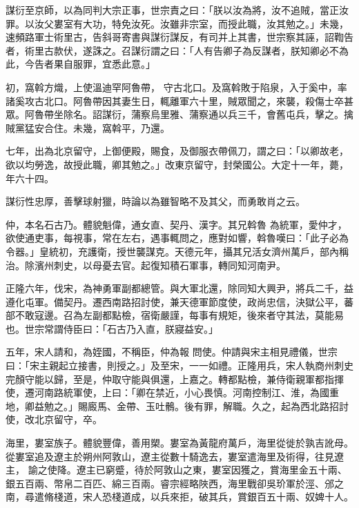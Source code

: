 \begin{pinyinscope}
 謀衍至京師，以為同判大宗正事，世宗責之曰：「朕以汝為將，汝不追賊，當正汝罪。以汝父婁室有大功，特免汝死。汝雖非宗室，而授此職，汝其勉之。」未幾，速頻路軍士術里古，告斜哥寄書與謀衍謀反，有司并上其書，世宗察其誣，詔鞫告者，術里古款伏，遂誅之。召謀衍謂之曰：「人有告卿子為反謀者，朕知卿必不為此，今告者果自服罪，宜悉此意。」



 初，窩斡方熾，上使溫迪罕阿魯帶，
 守古北口。及窩斡敗于陷泉，入于奚中，率諸奚攻古北口。阿魯帶因其妻生日，輒離軍六十里，賊眾聞之，來襲，殺傷士卒甚眾。阿魯帶坐除名。詔謀衍，蒲察烏里雅、蒲察通以兵三千，會舊屯兵，擊之。擒賊黨猛安合住。未幾，窩斡平，乃還。



 七年，出為北京留守，上御便殿，賜食，及御服衣帶佩刀，謂之曰：「以卿故老，欲以均勞逸，故授此職，卿其勉之。」改東京留守，封榮國公。大定十一年，薨，年六十四。



 謀衍性忠厚，善擊球射獵，時論以為雖智略不及其父，而勇敢肖之云。



 仲，本名石古乃。體貌魁偉，通女直、契丹、漢字。其兄斡魯
 為統軍，愛仲才，欲使通吏事，每視事，常在左右，遇事輒問之，應對如響，斡魯嘆曰：「此子必為令器。」皇統初，充護衛，授世襲謀克。天德元年，攝其兄活女濟州萬戶，部內稱治。除濱州刺史，以母憂去官。起復知積石軍事，轉同知河南尹。



 正隆六年，伐宋，為神勇軍副都總管。與大軍北還，除同知大興尹，將兵二千，益遵化屯軍。備契丹。遷西南路招討使，兼天德軍節度使，政尚忠信，決獄公平，蕃部不敢寇邊。召為左副都點檢，宿衛嚴謹，每事有規矩，後來者守其法，莫能易也。世宗常謂侍臣曰：「石古乃入直，朕寢益安。」



 五年，宋人請和，為姪國，不稱臣，仲為報
 問使。仲請與宋主相見禮儀，世宗曰：「宋主親起立接書，則授之。」及至宋，一一如禮。正隆用兵，宋人執商州刺史完顏守能以歸，至是，仲取守能與俱還，上嘉之。轉都點檢，兼侍衛親軍都指揮使，遷河南路統軍使，上曰：「卿在禁近，小心畏慎。河南控制江、淮，為國重地，卿益勉之。」賜廄馬、金帶、玉吐鶻。後有罪，解職。久之，起為西北路招討使，改北京留守，卒。



 海里，婁室族子。體貌豐偉，善用槊。婁室為黃龍府萬戶，海里從徙於孰吉訛母。從婁室追及遼主於朔州阿敦山，遼主從數十騎逸去，婁室遣海里及術得，往見遼主，
 諭之使降。遼主已窮蹙，待於阿敦山之東，婁室因獲之，賞海里金五十兩、銀五百兩、幣帛二百匹、綿三百兩。睿宗經略陜西，海里戰卻吳玠軍於涇、邠之南，尋遣脩棧道，宋人恐棧道成，以兵來拒，破其兵，賞銀百五十兩、奴婢十人。




\end{pinyinscope}
